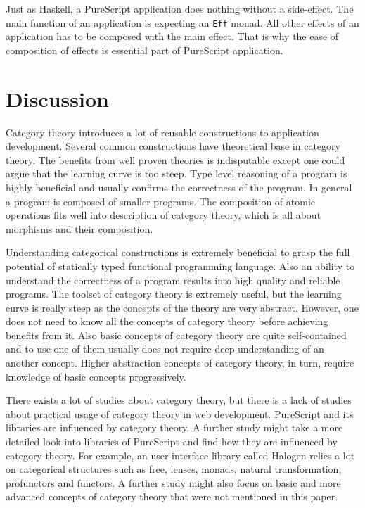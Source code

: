 \documentclass[article]{aaltoseries}
\begin{document}
      Just as Haskell, a PureScript application does nothing without a
      side-effect. The main function of an application is expecting an
      \lstinline|Eff| monad. All other effects of an application has to be
      composed with the main effect. That is why the ease of composition of
      effects is essential part of PureScript application.


\section{Discussion}

Category theory introduces a lot of reusable constructions to application
development. Several common constructions have theoretical base in category
theory. The benefits from well proven theories is indisputable except one could
argue that the learning curve is too steep. Type level reasoning of a program is
highly beneficial and usually confirms the correctness of the program. In
general a program is composed of smaller programs. The composition of atomic
operations fits well into description of category theory, which is all about
morphisms and their composition.
 
Understanding categorical constructions is extremely beneficial to grasp the
full potential of statically typed functional programming language. Also an
ability to understand the correctness of a program results into high quality and
reliable programs. The toolset of category theory is extremely useful, but the
learning curve is really steep as the concepts of the theory are very abstract.
However, one does not need to know all the concepts of category theory before
achieving benefits from it. Also basic concepts of category theory are quite
self-contained and to use one of them usually does not require deep
understanding of an another concept. Higher abstraction concepts of category
theory, in turn, require knowledge of basic concepts progressively.
 
There exists a lot of studies about category theory, but there is a lack of
studies about practical usage of category theory in web development. PureScript
and its libraries are influenced by category theory. A further study might take
a more detailed look into libraries of PureScript and find how they are
influenced by category theory. For example, an user interface library called
Halogen relies a lot on categorical structures such as free, lenses, monads,
natural transformation, profunctors and functors. A further study might also
focus on basic and more advanced concepts of category theory that were not
mentioned in this paper.
\end{document}
